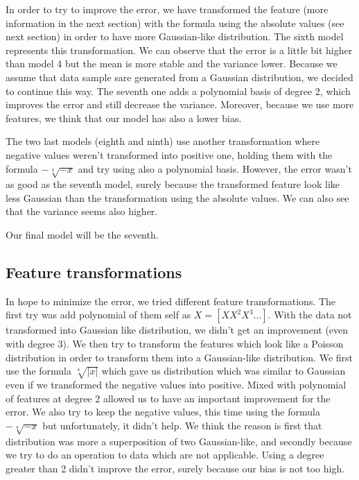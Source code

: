 \documentclass{article} %
\begin{document}
In order to try to improve the error, we have transformed the feature (more information in the next section) with the formula using the absolute values (see next section) in order to have more Gaussian-like distribution. The sixth model represents this transformation. We can observe that the error is a little bit higher than model 4 but the mean is more stable and the variance lower. Because we assume that data sample sare generated from a Gaussian distribution, we decided to continue this way. The seventh one adds a polynomial basis of degree 2, which improves the error and still decrease the variance. Moreover, because we use more features, we think that our model has also a lower bias.

The two last models (eighth and ninth) use another transformation where negative values weren't transformed into positive one, holding them with the formula $-\sqrt[4]{-x}$ and try using also a polynomial basis. However, the error wasn't as good as the seventh model, surely because the transformed feature look like less Gaussian than the transformation using the absolute values. We can also see that the variance seems also higher.

Our final model will be the seventh.

\subsection{Feature transformations}

In hope to minimize the error, we tried different feature transformations. The first try was add polynomial of them self as $X = [X X^2 X^3 ...]$. With the data not transformed into Gaussian like distribution, we didn't get an improvement (even with degree 3). We then try to transform the features which look like a Poisson distribution in order to transform them into a Gaussian-like distribution. We first use the formula $\sqrt[4]{|x|}$ which gave us distribution which was similar to Gaussian even if we transformed the negative values into positive. Mixed with polynomial of features at degree 2 allowed us to have an important improvement for the error. We also try to keep the negative values, this time using the formula $-\sqrt[4]{-x}$ but unfortunately, it didn't help. We think the reason is first that distribution was more a superposition of two Gaussian-like, and secondly  because we try to do an operation to data which are not applicable. Using a degree greater than 2 didn't improve the error, surely because our bias is not too high.
\end{document}

